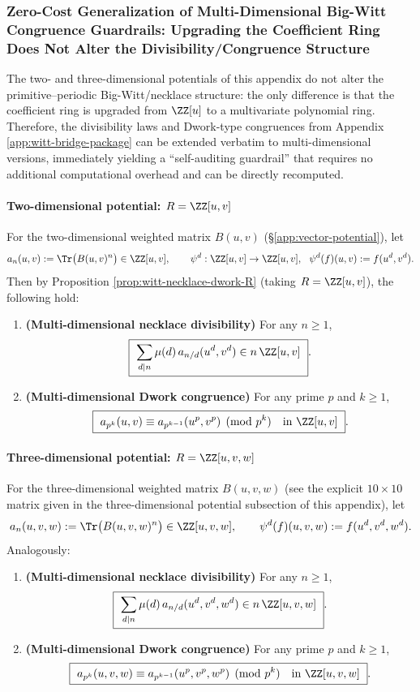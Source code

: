 \subsubsection{Zero-Cost Generalization of Multi-Dimensional Big-Witt Congruence Guardrails: Upgrading the Coefficient Ring Does Not Alter the Divisibility/Congruence Structure}\label{app:multi-dim-witt-guardrails}
The two- and three-dimensional potentials of this appendix do not alter the primitive--periodic Big-Witt/necklace structure: the only difference is that the coefficient ring is upgraded from \(\ZZ[u]\) to a multivariate polynomial ring.
Therefore, the divisibility laws and Dwork-type congruences from Appendix \ref{app:witt-bridge-package} can be extended verbatim to multi-dimensional versions, immediately yielding a ``self-auditing guardrail'' that requires no additional computational overhead and can be directly recomputed.

\paragraph{Two-dimensional potential: \texorpdfstring{$R=\ZZ[u,v]$}{R=Z[u,v]}}
For the two-dimensional weighted matrix \(B(u,v)\) (\S\ref{app:vector-potential}), let
\[
a_n(u,v):=\Tr\bigl(B(u,v)^n\bigr)\in\ZZ[u,v],
\qquad
\psi^d:\ZZ[u,v]\to\ZZ[u,v],\ \ \psi^d(f)(u,v):=f(u^d,v^d).
\]
Then by Proposition \ref{prop:witt-necklace-dwork-R} (taking \(R=\ZZ[u,v]\)), the following hold:
\begin{enumerate}
  \item \textbf{(Multi-dimensional necklace divisibility)} For any \(n\ge 1\),
  \[
  \boxed{\ \sum_{d\mid n}\mu(d)\,a_{n/d}(u^d,v^d)\in n\,\ZZ[u,v]\ }.
  \]
  \item \textbf{(Multi-dimensional Dwork congruence)} For any prime \(p\) and \(k\ge 1\),
  \[
  \boxed{\ a_{p^k}(u,v)\equiv a_{p^{k-1}}(u^p,v^p)\pmod{p^k}\quad\text{in}\ \ZZ[u,v]\ }.
  \]
\end{enumerate}

\paragraph{Three-dimensional potential: \texorpdfstring{$R=\ZZ[u,v,w]$}{R=Z[u,v,w]}}
For the three-dimensional weighted matrix \(B(u,v,w)\) (see the explicit \(10\times 10\) matrix given in the three-dimensional potential subsection of this appendix), let
\[
a_n(u,v,w):=\Tr\bigl(B(u,v,w)^n\bigr)\in\ZZ[u,v,w],
\qquad
\psi^d(f)(u,v,w):=f(u^d,v^d,w^d).
\]
Analogously:
\begin{enumerate}
  \item \textbf{(Multi-dimensional necklace divisibility)} For any \(n\ge 1\),
  \[
  \boxed{\ \sum_{d\mid n}\mu(d)\,a_{n/d}(u^d,v^d,w^d)\in n\,\ZZ[u,v,w]\ }.
  \]
  \item \textbf{(Multi-dimensional Dwork congruence)} For any prime \(p\) and \(k\ge 1\),
  \[
  \boxed{\ a_{p^k}(u,v,w)\equiv a_{p^{k-1}}(u^p,v^p,w^p)\pmod{p^k}\quad\text{in}\ \ZZ[u,v,w]\ }.
  \]
\end{enumerate}

